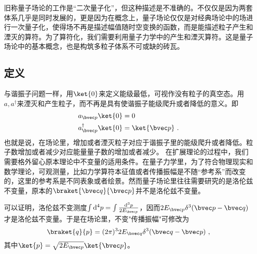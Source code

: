
\begin{issues}
\issueDraft
\end{issues}

旧称量子场论的工作是“二次量子化”，但这种描述是不准确的。不仅仅是因为两套体系几乎是同时发展的，更是因为在概念上，量子场论仅仅是对经典场论中的场进行一次量子化，使得场不再是描述幅值随时空变换的函数，而是能描述粒子产生和湮灭的算符。为了算符化，我们需要利用量子力学中的产生和湮灭算符。这是量子场论中的基本概念，也是构筑多粒子体系不可或缺的砖瓦。


\subsection{定义}

与谐振子问题一样，用$\ket{0}$来定义能级最低，可视作没有粒子的真空态。用$ a, a^\dagger$来湮灭和产生粒子，而不再是具有使谐振子能级爬升或者降低的意义。即
\begin{equation}
\begin{aligned}
a_{\bvec p}\ket{0}&=0\\
a^\dagger_{\bvec p}\ket{0}&=\ket{\bvec p}~.
\end{aligned}
\end{equation}
也就是说，在场论里，增加或者湮灭粒子对应于谐振子里的能级爬升或者降低。粒子数增加或者减少对应能量量子数的增加或者减少。
在扩展理论的过程中，我们需要格外留心原本理论中不变量的适用条件。在量子力学里，为了符合物理现实和数学理论，可观测量，比如力学算符本征值或者传播振幅是不随“参考系”而改变的，这里的参考系是不同表象或者绘景。然而量子场论里往往需要研究的是洛伦兹不变量，原本的$\braket{\bvec q}{\bvec p}$并不是洛伦兹不变量。

可以证明，洛伦兹不变测度$\int\mathrm d^4 p=\int\frac{\mathrm d^3 p}{2E_{\bvec p}}$，因而$2E_{\bvec p}\delta^3 (\bvec p-\bvec q)$才是洛伦兹不变量。于是在场论里，不变"传播振幅"可修改为
\begin{equation}
\braket{ q}{ p}=(2 \pi)^3 2 E_{\bvec q}\delta^3 (\bvec q-\bvec p)~,
\end{equation}
其中$\ket{p}=\sqrt{2 E_{\bvec p}}\ket{\bvec p}$。
